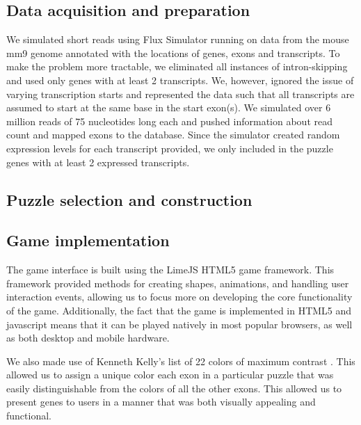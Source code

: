 \documentclass[12pt]{article}
\begin{document}
\subsection*{Data acquisition and preparation}
We simulated short reads using Flux Simulator \cite{sammeth2010flux} running on data from the mouse mm9 genome annotated with the locations of genes, exons and transcripts. To make the problem more tractable, we eliminated all instances of intron-skipping and used only genes with at least 2 transcripts. We, however, ignored the issue of varying transcription starts and represented the data such that all transcripts are assumed to start at the same base in the start exon(s). We simulated over 6 million reads of 75 nucleotides long each and pushed information about read count and mapped exons to the database. Since the simulator created random expression levels for each transcript provided, we only included in the puzzle genes with at least 2 expressed transcripts.

\subsection*{Puzzle selection and construction}

\subsection*{Game implementation}
The game interface is built using the LimeJS HTML5 game framework. This framework provided methods for creating shapes,
animations, and handling user interaction events, allowing us to focus more on developing the core functionality of the game.
Additionally, the fact that the game is implemented in HTML5 and javascript means that it can be played natively in most 
popular browsers, as well as both desktop and mobile hardware.

We also made use of Kenneth Kelly's list of 22 colors of maximum contrast \citep{green2010colour}. This allowed us to assign a unique color each exon
in a particular puzzle that was easily distinguishable from the colors of all the other exons. This allowed us to present genes to 
users in a manner that was both visually appealing and functional.
\end{document}
